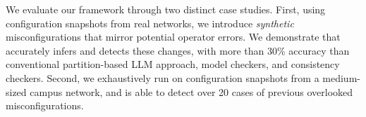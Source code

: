 We evaluate our framework through two distinct case studies.
First, using configuration snapshots from real networks, we introduce {\em synthetic} misconfigurations that mirror potential operator errors. 
We demonstrate that \sysname{} accurately infers and detects these changes, with more than 30\%
accuracy than conventional partition-based LLM approach, model checkers, and consistency checkers.
Second, we exhaustively run \sysname{} on configuration snapshots from a medium-sized campus network, and \sysname{} is able to detect over 20 cases of previous overlooked misconfigurations.
